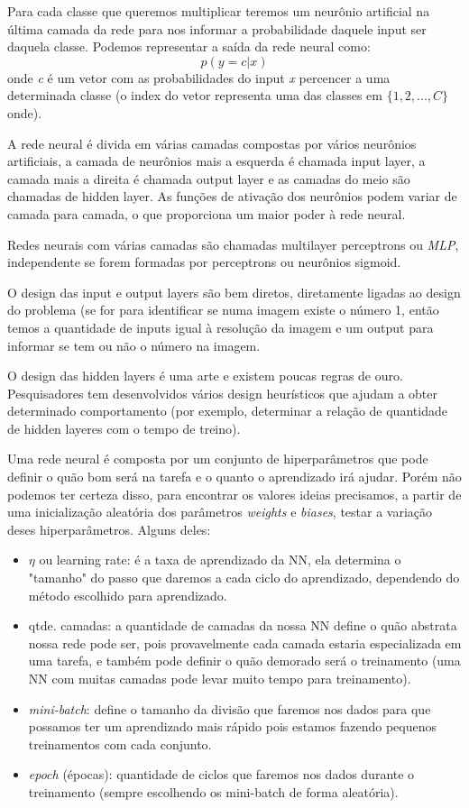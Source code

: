 \documentclass[11pt,a4paper,leqno]{article}
\begin{document}
Para cada classe que queremos multiplicar teremos um neurônio artificial na última camada da rede para nos informar a probabilidade daquele input ser daquela classe.
Podemos representar a saída da rede neural como:
\[
	p(y = c | x)
\]
onde \emph{c} é um vetor com as probabilidades do input \emph{x} percencer a uma determinada classe (o index do vetor representa uma das classes em $\{ 1, 2, ..., C \}$ onde).

A rede neural é divida em várias camadas compostas por vários neurônios artificiais, a camada de neurônios mais a esquerda é chamada input layer, a camada mais a direita é chamada output layer e as camadas do meio são chamadas de hidden layer.
As funções de ativação dos neurônios podem variar de camada para camada, o que proporciona um maior poder à rede neural.

Redes neurais com várias camadas são chamadas multilayer perceptrons ou \emph{MLP}, independente se forem formadas por perceptrons ou neurônios sigmoid.

O design das input e output layers são bem diretos, diretamente ligadas ao design do problema (se for para identificar se numa imagem existe o número 1, então temos a quantidade de inputs igual à resolução da imagem e um output para informar se tem ou não o número na imagem.
	
O design das hidden layers é uma arte e existem poucas regras de ouro. Pesquisadores tem desenvolvidos vários design heurísticos que ajudam a obter determinado comportamento (por exemplo, determinar a relação de quantidade de hidden layeres com o tempo de treino).

Uma rede neural é composta por um conjunto de hiperparâmetros que pode definir o quão bom será na tarefa e o quanto o aprendizado irá ajudar. Porém não podemos ter certeza disso, para encontrar os valores ideias precisamos, a partir de uma inicialização aleatória dos parâmetros \emph{weights} e \emph{biases}, testar a variação deses hiperparâmetros.
Alguns deles:
\begin{itemize}
\item $\eta$ ou learning rate: é a taxa de aprendizado da NN, ela determina o "tamanho" do passo que daremos a cada ciclo do aprendizado, dependendo do método escolhido para aprendizado.
\item qtde. camadas: a quantidade de camadas da nossa NN define o quão abstrata nossa rede pode ser, pois provavelmente cada camada estaria especializada em uma tarefa, e também pode definir o quão demorado será o treinamento (uma NN com muitas camadas pode levar muito tempo para treinamento).
\item \emph{mini-batch}: define o tamanho da divisão que faremos nos dados para que possamos ter um aprendizado mais rápido pois estamos fazendo pequenos treinamentos com cada conjunto.
\item \emph{epoch} (épocas): quantidade de ciclos que faremos nos dados durante o treinamento (sempre escolhendo os mini-batch de forma aleatória).
\end{itemize}
\end{document}
